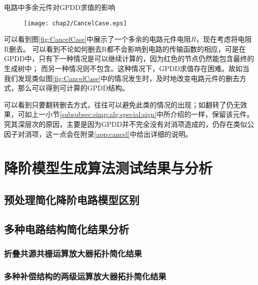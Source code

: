 \begin{exmp}
电路中多余元件对GPDD求值的影响
	
\begin{figure}[!htp]
	\centering
	\texttt{[image: chap2/CancelCase.eps]}
\end{figure}

可以看到图\ref{fig:CancelCase}中展示了一个多余的电路元件电阻$R$，现在考虑将电阻R删去。
可以看到不论如何删去R都不会影响到电路的传输函数的相应，可是在GPDD中，只有下一种情况是可以继续计算的，因为红色的节点仍然能包含最终的生成树中；
而另一种情况则不包含。这种情况下，GPDD求值存在困难。故如当我们发现类似图\ref{fig:CancelCase}中的情况发生时，及时地改变电路元件的删去方式，那么可以得到可计算的GPDD结构。

\end{exmp}

可以看到只要翻转删去方式，往往可以避免此类的情况的出现；如翻转了仍无效果，可如上一小节\ref{subsubsec:simp:alg:special:sign}中所介绍的一样，保留该元件。
究其深层次的原因，主要是因为GPDD并不完全没有对消项造成的，仍存在类似公因子对消项，这一点会在附录\ref{app:cancel}中给出详细的说明。

\section{降阶模型生成算法测试结果与分析}
\label{sec:simp:res}

\subsection{预处理简化降阶电路模型区别}
\label{subsec:simp:res:pre}

\subsection{多种电路结构简化结果分析}
\label{subsec:simp:res:cir}

\subsubsection{折叠共源共栅运算放大器拓扑简化结果}
\label{subsubsec:simp:res:cir:fd}

\subsubsection{多种补偿结构的两级运算放大器拓扑简化结果}
\label{subsubsec:simp:res:cir:ts}

